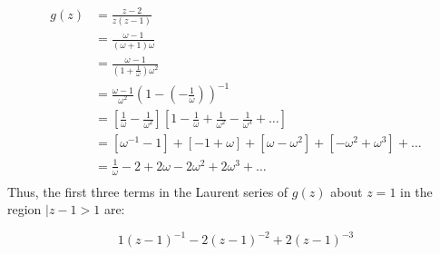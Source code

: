 \documentclass[a4paper, 11pt]{article}
\begin{document}
\begin{multicols}{2}
\begin{enumerate}[label=(\alph*)]
		      \begin{align*}
			      g(z) & = \frac{z-2}{z(z-1)}                                                                                                                     \\
			           & = \frac{\omega-1}{(\omega + 1)\omega}                                                                                                    \\
			           & = \frac{\omega-1}{(1 + \frac{1}\omega)\omega^2}                                                                                          \\
			           & = \frac{\omega-1}{\omega^2} \left(1 - \left(-\frac1\omega\right) \right)^{-1}                                                            \\
			           & = \left[ \frac1\omega - \frac 1{\omega^2}  \right] \left[ 1-\frac1\omega+\frac1{\omega^2}-\frac1{\omega^3}+\dots \right]                 \\
			           & = \left[ \omega^{-1}-1 \right] + \left[ -1 +\omega  \right] +\left[ \omega - \omega^2 \right] + \left[ -\omega^2 +\omega^3 \right]+\dots \\
			           & = \frac 1\omega -2 +2\omega  -2 \omega^2 +2\omega^3 +\dots                                                                               \\
		      \end{align*}
		      Thus, the first three terms in the Laurent series of $g(z)$ about $z=1$ in the region $|z-1>1$ are:

		      $$1 (z-1)^{-1}  - 2(z-1)^{-2} + 2(z-1)^{-3} $$



	\end{enumerate}


\end{multicols}
\end{document}
